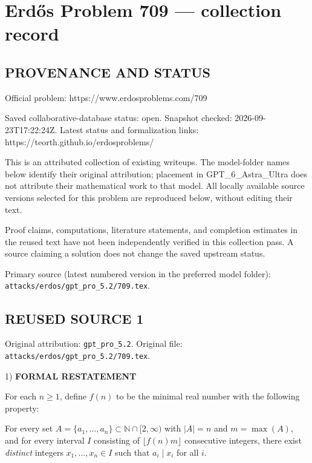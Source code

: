 \section*{Erd\H{o}s Problem 709 --- collection record}

\subsection*{PROVENANCE AND STATUS}
Official problem: https://www.erdosproblems.com/709

Saved collaborative-database status: open.
Snapshot checked: 2026-09-23T17:22:24Z.
Latest status and formalization links: https://teorth.github.io/erdosproblems/

This is an attributed collection of existing writeups. The model-folder names below identify their original attribution; placement in GPT\_6\_Astra\_Ultra does not attribute their mathematical work to that model. All locally available source versions selected for this problem are reproduced below, without editing their text.

Proof claims, computations, literature statements, and completion estimates in the reused text have not been independently verified in this collection pass. A source claiming a solution does not change the saved upstream status.

Primary source (latest numbered version in the preferred model folder): \texttt{attacks/erdos/gpt\_pro\_5.2/709.tex}.

\subsection*{REUSED SOURCE 1}
Original attribution: \texttt{gpt\_pro\_5.2}.
Original file: \texttt{attacks/erdos/gpt\_pro\_5.2/709.tex}.


1) \textbf{FORMAL RESTATEMENT}

For each $n\ge 1$, define $f(n)$ to be the minimal real number with the following property:

For every set $A=\{a_1,\dots,a_n\}\subset\mathbb{N}\cap[2,\infty)$ with $|A|=n$ and $m=\max(A)$, and for every interval $I$ consisting of $\lfloor f(n)m\rfloor$ consecutive integers, there exist \emph{distinct} integers $x_1,\dots,x_n\in I$ such that $a_i\mid x_i$ for all $i$.

